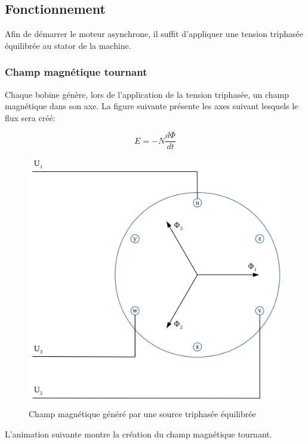 \documentclass[11pt]{article}
\begin{document}
    \hypertarget{fonctionnement}{%
\subsection{Fonctionnement}\label{fonctionnement}}

    Afin de démarrer le moteur asynchrone, il suffit d'appliquer une tension
triphasée équilibrée au stator de la machine.

    \hypertarget{champ-magnuxe9tique-tournant}{%
\subsubsection{Champ magnétique
tournant}\label{champ-magnuxe9tique-tournant}}

    Chaque bobine génère, lors de l'application de la tension triphasée, un
champ magnétique dans son axe. La figure suivante présente les axes
suivant lesquels le flux sera créé:

    \[ E = -N \frac{d\Phi}{dt} \]

    \begin{figure}[!hbt]
        \centering
        \includegraphics{Images/MAS/champ_tournant.png}
        \caption{Champ magnétique généré par une source triphasée équilibrée}
    \end{figure}

    L'animation suivante montre la création du champ magnétique tournant.
\end{document}
